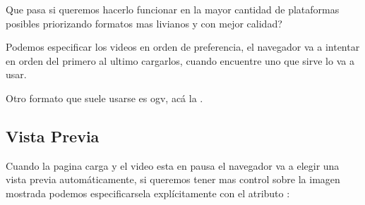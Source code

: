 \documentclass[letterpaper,10pt,spanish]{sphinxmanual}
\begin{document}
Que pasa si queremos hacerlo funcionar en la mayor cantidad de plataformas
posibles priorizando formatos mas livianos y con mejor calidad?

Podemos especificar los videos en orden de preferencia, el navegador va a
intentar en orden del primero al ultimo cargarlos, cuando encuentre uno que
sirve lo va a usar.

%
\begin{sphinxVerbatim}[commandchars=\\\{\}]
 
      
      
\end{sphinxVerbatim}



Otro formato que suele usarse es ogv, acá la .


\subsection{Vista Previa}
\label{\detokenize{audio-y-video:vista-previa}}
Cuando la pagina carga y el video esta en pausa el navegador va a elegir una
vista previa automáticamente, si queremos tener mas control sobre la imagen
mostrada podemos especificarsela explícitamente con el atributo :

%
\begin{sphinxVerbatim}[commandchars=\\\{\}]
  
      
      
\end{sphinxVerbatim}
\end{document}
